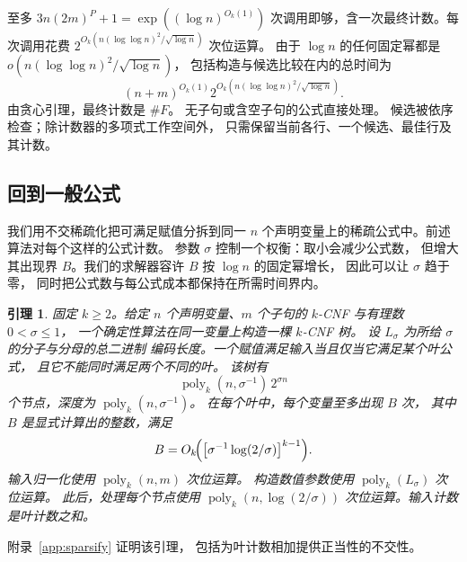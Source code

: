 \documentclass[11pt,reqno]{amsart}
\numberwithin{equation}{section}
\newtheorem{lemma}[theorem]{引理}
\theoremstyle{definition}\newtheorem{definition}[theorem]{定义}
\theoremstyle{remark}\newtheorem{remark}[theorem]{注}
\newcommand{\poly}{\operatorname{poly}}
\renewcommand{\le}{\leqslant}
\renewcommand{\ge}{\geqslant}
\begin{document}
至多 $3n(2m)^P+1=\exp((\log n)^{O_k(1)})$
次调用即够，含一次最终计数。每次调用花费
$2^{O_k(n(\log\log n)^2/\sqrt{\log n})}$ 次位运算。
由于 $\log n$ 的任何固定幂都是
$o(n(\log\log n)^2/\sqrt{\log n})$，
包括构造与候选比较在内的总时间为
\begin{equation}\label{eq:sparse-formula-cost}
 (n+m)^{O_k(1)}2^{O_k(n(\log\log n)^2/\sqrt{\log n})}.
\end{equation}
由贪心引理，最终计数是 $\#F$。
无子句或含空子句的公式直接处理。
候选被依序检查；除计数器的多项式工作空间外，
只需保留当前各行、一个候选、最佳行及其计数。

\subsection{回到一般公式}\label{subsec:general-reduction}

我们用不交稀疏化把可满足赋值分拆到同一 $n$
个声明变量上的稀疏公式中。前述算法对每个这样的公式计数。
参数 $\sigma$ 控制一个权衡：取小会减少公式数，
但增大其出现界 $B$。我们的求解器容许 $B$
按 $\log n$ 的固定幂增长，
因此可以让 $\sigma$ 趋于零，
同时把公式数与每公式成本都保持在所需时间界内。

\begin{lemma}\label{lem:sparsify}
固定 $k\ge2$。给定 $n$ 个声明变量、$m$
个子句的 $k$-CNF 与有理数 $0<\sigma\le1$，
一个确定性算法在同一变量上构造一棵 $k$-CNF 树。
设 $L_\sigma$ 为所给 $\sigma$ 的分子与分母的总二进制
编码长度。一个赋值满足输入当且仅当它满足某个叶公式，
且它不能同时满足两个不同的叶。
该树有
\[
 \operatorname{poly}_k(n,\sigma^{-1})\,2^{\sigma n}
\]
个节点，深度为 $\poly_k(n,\sigma^{-1})$。
在每个叶中，每个变量至多出现 $B$ 次，
其中 $B$ 是显式计算出的整数，满足
\[
 B=O_k\!\Bigl(\bigl[\sigma^{-1}\log(2/\sigma)\bigr]^{k-1}\Bigr).
\]
输入归一化使用 $\poly_k(n,m)$ 次位运算。
构造数值参数使用 $\poly_k(L_\sigma)$ 次位运算。
此后，处理每个节点使用 $\poly_k(n,\log(2/\sigma))$
次位运算。输入计数是叶计数之和。
\end{lemma}
附录~\ref{app:sparsify} 证明该引理，
包括为叶计数相加提供正当性的不交性。
\end{document}
